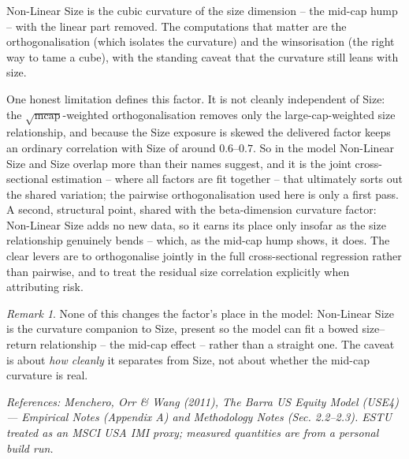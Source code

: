 \documentclass[11pt]{article}
\theoremstyle{definition}
\theoremstyle{plain}
\theoremstyle{remark}
\newtheorem*{remark}{Remark}
\begin{document}
\begin{keyresult}
Non-Linear Size is the cubic curvature of the size dimension -- the mid-cap hump -- with the linear part removed. The computations that matter are the orthogonalisation (which isolates the curvature) and the winsorisation (the right way to tame a cube), with the standing caveat that the curvature still leans with size.
\end{keyresult}

\begin{pitfall}
One honest limitation defines this factor. It is not cleanly independent of Size: the $\sqrt{\text{mcap}}$-weighted orthogonalisation removes only the large-cap-weighted size relationship, and because the Size exposure is skewed the delivered factor keeps an ordinary correlation with Size of around $0.6$--$0.7$. So in the model Non-Linear Size and Size overlap more than their names suggest, and it is the joint cross-sectional estimation -- where all factors are fit together -- that ultimately sorts out the shared variation; the pairwise orthogonalisation used here is only a first pass. A second, structural point, shared with the beta-dimension curvature factor: Non-Linear Size adds no new data, so it earns its place only insofar as the size relationship genuinely bends -- which, as the mid-cap hump shows, it does. The clear levers are to orthogonalise jointly in the full cross-sectional regression rather than pairwise, and to treat the residual size correlation explicitly when attributing risk.
\end{pitfall}

\begin{remark}
None of this changes the factor's place in the model: Non-Linear Size is the curvature companion to Size, present so the model can fit a bowed size--return relationship -- the mid-cap effect -- rather than a straight one. The caveat is about \emph{how cleanly} it separates from Size, not about whether the mid-cap curvature is real.
\end{remark}

\begin{center}\small\itshape
References: Menchero, Orr \& Wang (2011), \textit{The Barra US Equity Model (USE4)} --- Empirical Notes (Appendix A) and Methodology Notes (Sec. 2.2--2.3). ESTU treated as an MSCI USA IMI proxy; measured quantities are from a personal build run.
\end{center}
\end{document}
